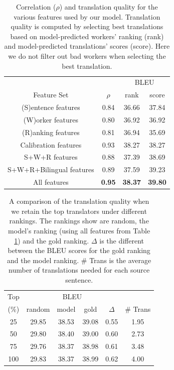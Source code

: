 \documentclass[11pt,letterpaper]{article}
\begin{document}
\begin{table}[htbp]
 \center
\begin{tabular}{c|c|cc}
\hline
 & & \multicolumn{2}{c}{BLEU}\\
Feature Set             & $\rho$  & rank & score    \\ \hhline{====}
(S)entence features     & 0.84 & 36.66 &37.84 \\
(W)orker features       & 0.80 & 36.92 &36.92 \\
(R)anking features      & 0.81 & 36.94 &35.69\\
Calibration features  & 0.93 & 38.27 &38.27\\
S+W+R features          & 0.88 & 37.39 & 38.69\\
S+W+R+Bilingual features        & 0.89 & 37.59 &39.23 \\
All features            & \textbf{0.95} & \textbf{38.37} & \textbf{39.80}\\ \hline
\end{tabular}
\caption{\label{lrresult} Correlation ($\rho$) and translation quality for the various features used by our model.  Translation quality is computed by selecting best translations based on model-predicted workers' ranking (rank) and model-predicted translations' scores (score). Here we do not filter out bad workers when selecting the best translation.}
\end{table}



\begin{table}[htbp]
\center
\begin{tabular}{c|ccccc}
\hline
Top & \multicolumn{4}{c}{BLEU}&\\
 (\%) &random & model & gold & $\Delta$ & \# Trans\\\hhline{======}
25      &29.85& 38.53   & 39.08      & 0.55   & 1.95         \\
50      &29.80& 38.40   & 39.00      & 0.60   & 2.73         \\
75      &29.76& 38.37   & 38.98      & 0.61   & 3.48         \\
100     &29.83& 38.37   & 38.99      & 0.62   & 4.00         \\ \hline
\end{tabular}
\caption{\label{modeltoprank} A comparison of the translation quality when we retain the top translators under different rankings.  The rankings show are random, the model's ranking (using all features from Table \ref{lrresult}) and the gold ranking.  $\Delta$ is the different between the BLEU scores for the gold ranking and the model ranking. \# Trans is the average number of translations needed for each source sentence. 
}
\end{table} 
\end{document}
